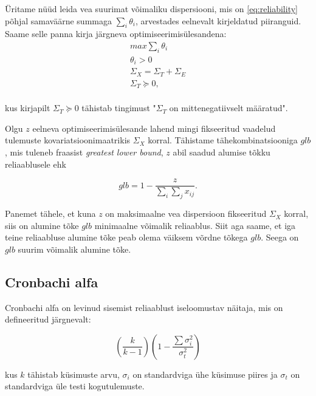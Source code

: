 \documentclass[a4paper,12pt]{article}
\numberwithin{equation}{section}
\theoremstyle{definition}
\begin{document}
\"Uritame n\"u\"ud  leida vea suurimat võimaliku dispersiooni, mis on \eqref{eq:reliability} põhjal samaväärne summaga $\sum_i \theta_i$, arvestades eelnevalt kirjeldatud piiranguid. Saame selle panna kirja järgneva optimiseerimis\"ulesandena:
\begin{equation}
\begin{gathered}
max \sum_i \theta_i \\
\theta_i > 0 \\
\Sigma_X = \Sigma_T + \Sigma_E \\
\Sigma_T \succeq 0, \\
\end{gathered} 
\end{equation} 

kus kirjapilt $\Sigma_T \succeq 0$ tähistab tingimust "$\Sigma_T$ on mittenegatiivselt määratud". 

Olgu $z$ eelneva optimiseerimis\"ulesande lahend mingi fikseeritud vaadelud tulemuste kovariatsioonimaatrikis $\Sigma_X$ korral. Tähistame tähekombinatsiooniga $glb$, mis tuleneb fraasist \textit{greatest lower bound}, $z$ abil saadud alumise tõkku reliaablusele ehk

\begin{equation*}
glb = 1 - \frac{z}{\sum_i \sum_j x_{ij}}.
\end{equation*}  

Panemet tähele, et kuna $z$ on maksimaalne vea dispersioon fikseeritud $\Sigma_X$ korral, siis on alumine tõke $glb$ minimaalne võimalik reliaablus. Siit aga saame, et iga teine reliaabluse alumine tõke peab olema väiksem võrdne tõkega $glb$. Seega on $glb$ suurim võimalik alumine tõke. 






\subsection{Cronbachi alfa}

Cronbachi alfa on levinud sisemist reliaablust iseloomustav näitaja, mis on defineeritud järgnevalt:

\begin{equation}
(\frac{k}{k-1})( 1 - \frac{\sum \sigma_i^2}{\sigma_t^2})
\end{equation}

kus $k$ tähistab k\"usimuste arvu, $\sigma_i$ on standardviga \"uhe k\"usimuse piires ja $\sigma_t$ on standardviga \"ule testi kogutulemuste.\cite[396]{Cronbach2004}
\end{document}
